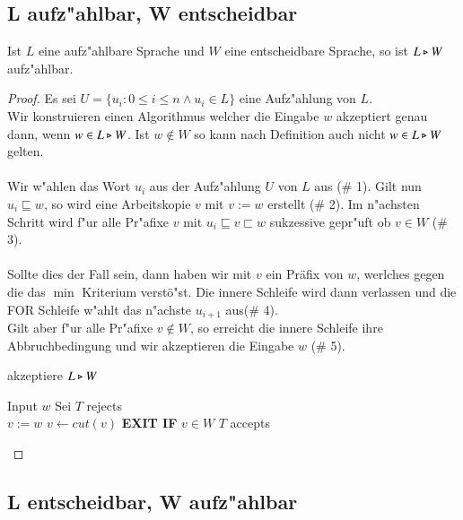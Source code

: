 \subsection{L aufz"ahlbar, W entscheidbar}
\begin{satz}
Ist $L$ eine aufz"ahlbare Sprache und $W$ eine entscheidbare Sprache, so ist $L\triangleright W$ aufz"ahlbar.
\end{satz}
\begin{proof}
Es sei $U=\{u_i : 0 \le i \le n \wedge u_i \in L\}$ eine Aufz"ahlung von $L$.\\
Wir konstruieren einen Algorithmus welcher die Eingabe $w$ akzeptiert genau dann, wenn $w\in L\triangleright W$.
Ist $w\notin W$ so kann nach Definition auch nicht $w\in L\triangleright W$ gelten. \\\\Wir w"ahlen das Wort $u_i$ aus der Aufz"ahlung $U$ von $L$ aus (\# 1).
Gilt nun $u_i\sqsubseteq w$, so wird eine Arbeitskopie $v$ mit $v:=w$ erstellt (\# 2). Im n"achsten Schritt wird f"ur alle Pr"afixe $v$ mit $u_i\sqsubseteq v\sqsubset w$ sukzessive gepr"uft ob $v\in W$ (\# 3). 
\\\\Sollte dies der Fall sein, dann haben wir mit $v$ ein Präfix von $w$, werlches gegen die das $\min$ Kriterium verstö"st. Die innere Schleife wird dann verlassen und die FOR Schleife w"ahlt das n"achste $u_{i+1}$ aus(\# 4).%
\\Gilt aber f"ur alle Pr"afixe $v\notin W$, so erreicht die innere Schleife ihre Abbruchbedingung und wir akzeptieren die Eingabe $w$ (\# 5).


\begin{algorithm}
\caption{akzeptiere $L\triangleright W$}
\label{split2}
\begin{algorithmic}
\STATE Input $w$
\STATE Sei
\STATE $T$ rejects
\ENDIF\\
\STATE $v := w$ 
\STATE $v \leftarrow cut(v)$ 
\STATE \textbf{EXIT IF} $v\in W$ 
\ENDWHILE
{}
\STATE $T$ accepts 
\ENDIF
\ENDIF
\ENDFOR

\end{algorithmic}
\end{algorithm}
\end{proof}
\newpage
\subsection{L entscheidbar, W aufz"ahlbar}

